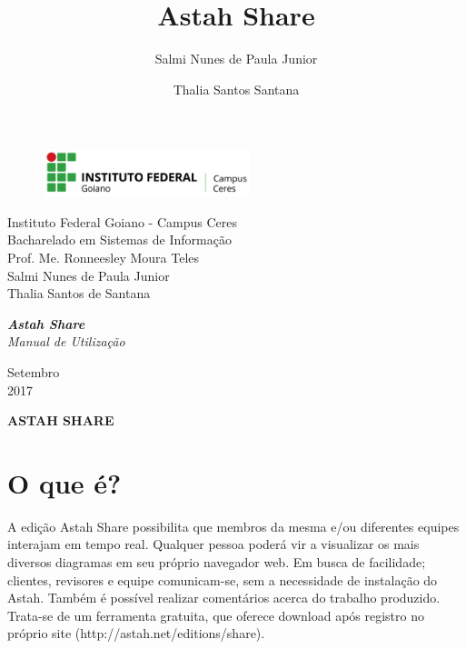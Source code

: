 \documentclass[12pt,a4paper]{article}
\title{Astah Share}
\author{Salmi Nunes de Paula Junior \and Thalia Santos Santana}
\begin{document}
\begin{titlepage}


\begin{center}
\begin{figure}[htb]
		
		\label{figura:LogoIF}
	
		\centering
		\includegraphics[width=6cm]{logo.png} 
\end{figure}


Instituto Federal Goiano - Campus Ceres\\
Bacharelado em Sistemas de Informação\\
Prof. Me. Ronneesley Moura Teles\\\vspace{0.2cm}
Salmi Nunes de Paula Junior \\
Thalia Santos de Santana\\\vspace{7.0cm}

\textit{\textbf{\Large{Astah Share}}}\\\vspace{0.5cm}
\textit{\Large{Manual de Utilização}}\\\vspace{9.5cm}

Setembro\\
2017\\
\end{center}
\end{titlepage}



\tableofcontents

\newpage
\begin{center}
\textbf{\Large{ASTAH SHARE}}\\\vspace{0.5cm}
\end{center}
\section{O que é?}%

A edição Astah Share possibilita que membros da mesma e/ou diferentes equipes interajam em tempo real. Qualquer pessoa poderá vir a visualizar os mais diversos diagramas em seu próprio navegador web. Em busca de facilidade; clientes, revisores e equipe comunicam-se, sem a necessidade de instalação do Astah. Também é possível realizar comentários acerca do trabalho produzido. Trata-se de um ferramenta gratuita, que oferece download após registro no próprio site (http://astah.net/editions/share).
\end{document}
